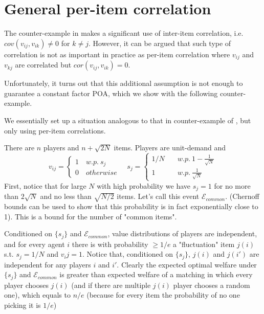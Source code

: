 \section{General per-item correlation}

The counter-example in \cite{roughgarden} makes a significant use of inter-item correlation, i.e. $cov(v_{ij},v_{ik})\neq 0$ for $k\neq j$. However, it can be argued that such type of correlation is not as important in practice as per-item correlation where $v_{ij}$ and $v_{kj}$ are correlated but $cor(v_{ij},v_{ik}) = 0$. 


Unfortunately, it turns out that this additional assumption is not enough to guarantee a constant factor POA, which we show with the following counter-example.

\begin{example}
We essentially set up a situation analogous to that in counter-example of \cite{roughgarden}, but only using per-item correlations.

There are $n$ players and $n+\sqrt{2N}$ items. Players are unit-demand and 
$$v_{ij} =\begin{cases} 
1\quad w.p.\ s_j\\
0\quad otherwise
\end{cases}
\quad
s_j = \begin{cases}
1/N \quad &w.p.\ 1-\frac{1}{\sqrt{N}}\\
1 \quad &w.p.\ \frac{1}{\sqrt{N}}
\end{cases}
$$
First, notice that for large $N$ with high probability we have $s_j=1$ for no more than $2\sqrt{N}$ and no less than $\sqrt{N/2}$ items. Let's call this event $\mathcal{E}_{common}$. (Chernoff bounds can be used to show that this probability is in fact exponentially close to 1). This is a bound for the number of "common items".

Conditioned on $\{s_j\}$ and $\mathcal{E}_{common}$, value distributions of players are independent, and for every agent $i$ there is with probability $\geq 1/e$ a "fluctuation" item $j(i)$ s.t. $s_j=1/N$ and $v_ij = 1$. Notice that, conditioned on $\{s_j\}$, $j(i)$ and $j(i')$ are independent for any players $i$ and $i'$. Clearly the expected optimal welfare under $\{s_j\}$ and $\mathcal{E}_{common}$ is greater than expected welfare of a matching in which every player chooses $j(i)$ (and if there are multiple $j(i)$ player chooses a random one), which equals to $n/e$ (because for every item the probability of no one picking it is $1/e$)


\end{example}
